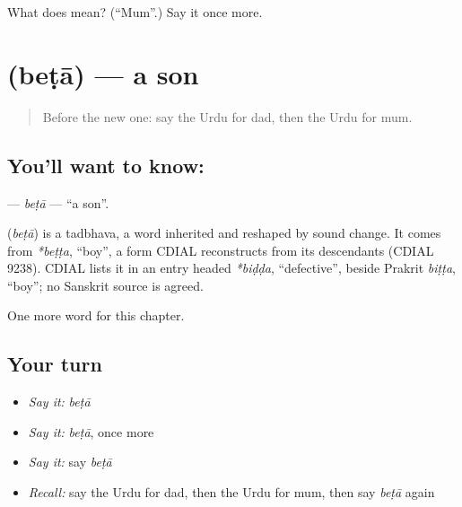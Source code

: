 \begin{tcolorbox}[breakable,colback=teal!4,colframe=teal!35!black,title={Before you move on}]
What does  mean? (\textquotedblleft{}Mum\textquotedblright{}.) Say it once more.
\end{tcolorbox}
\section[\texorpdfstring{\ur{بیٹا} (beṭā)}{بیٹا (beṭā)}]{ (beṭā) — a son}

\label{lesson:UR-C43-beta}



\begin{quote}
Before the new one: say the Urdu for dad, then the Urdu for mum.
\end{quote}

\subsection*{You'll want to know: }
\textbf{} — \emph{beṭā} — \textquotedblleft{}a son\textquotedblright{}.

\begin{cousinweb}
\textbf{} (\emph{beṭā}) is a tadbhava, a word inherited and reshaped by sound change. It comes from \emph{*beṭṭa}, \textquotedblleft{}boy\textquotedblright{}, a form CDIAL reconstructs from its descendants (CDIAL 9238). CDIAL lists it in an entry headed \emph{*biḍḍa}, \textquotedblleft{}defective\textquotedblright{}, beside Prakrit \emph{biṭṭa}, \textquotedblleft{}boy\textquotedblright{}; no Sanskrit source is agreed.
\end{cousinweb}

\begin{grammarlens}[title={What you've built}]
One more word for this chapter.
\end{grammarlens}

\subsection*{Your turn}
\begin{itemize}
\raggedright
  \item \emph{Say it:} \emph{beṭā}
  \item \emph{Say it:} \emph{beṭā}, once more
  \item \emph{Say it:} say \emph{beṭā}
  \item \emph{Recall:} say the Urdu for dad, then the Urdu for mum, then say \emph{beṭā} again
\end{itemize}

